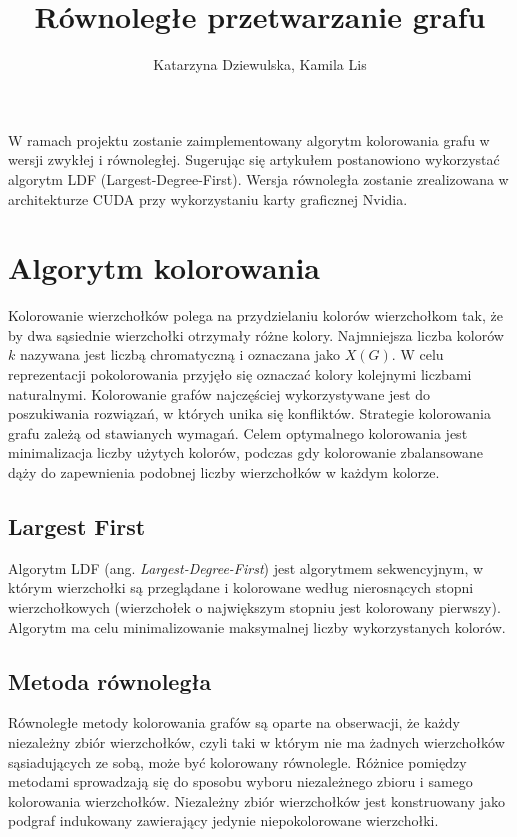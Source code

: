 \documentclass{article}
\date{}
\author{Katarzyna Dziewulska, Kamila Lis}
\title{Równoległe przetwarzanie grafu}
\begin{document}
	\maketitle
	W ramach projektu zostanie zaimplementowany algorytm kolorowania grafu w wersji zwykłej i równoległej. Sugerując się artykułem \cite{article} postanowiono wykorzystać algorytm LDF (Largest-Degree-First). Wersja równoległa zostanie zrealizowana w architekturze CUDA przy wykorzystaniu karty graficznej Nvidia.\\
	
	\section{Algorytm kolorowania}
	Kolorowanie wierzchołków polega na  przydzielaniu kolorów wierzchołkom tak, że by dwa sąsiednie wierzchołki otrzymały różne kolory. Najmniejsza liczba kolorów $k$ nazywana jest liczbą chromatyczną i oznaczana jako $X(G)$. W celu reprezentacji pokolorowania przyjęło się oznaczać kolory kolejnymi liczbami naturalnymi. Kolorowanie grafów najczęściej wykorzystywane jest do poszukiwania rozwiązań, w których unika się konfliktów. Strategie kolorowania grafu zależą od stawianych wymagań. Celem optymalnego kolorowania jest minimalizacja liczby użytych kolorów, podczas gdy kolorowanie zbalansowane dąży do zapewnienia podobnej liczby wierzchołków w każdym kolorze.
	\subsection{Largest First}
	Algorytm LDF (ang. \textit{Largest-Degree-First}) jest algorytmem sekwencyjnym, w którym wierzchołki są przeglądane i kolorowane według nierosnących stopni wierzchołkowych (wierzchołek o największym stopniu jest kolorowany pierwszy). Algorytm ma celu minimalizowanie maksymalnej liczby wykorzystanych kolorów.
	
	\subsection{Metoda równoległa}
	Równoległe metody kolorowania grafów są oparte na obserwacji, że każdy niezależny zbiór wierzchołków, czyli taki w którym nie ma żadnych wierzchołków sąsiadujących ze sobą, może być kolorowany równolegle. Różnice pomiędzy metodami sprowadzają się do sposobu wyboru niezależnego zbioru i samego kolorowania wierzchołków. Niezależny zbiór wierzchołków jest konstruowany jako podgraf indukowany zawierający jedynie niepokolorowane wierzchołki.
	
\end{document}
